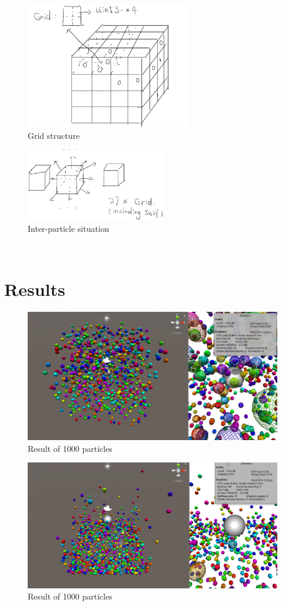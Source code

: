 \documentclass[acmtog]{acmart}
\begin{document}
\begin{figure}[!h]
	\includegraphics[width=7.2cm]{grid}
	\caption{Grid structure}
\end{figure}

\begin{figure}[!h]
	\includegraphics[width=6.1cm]{inter-particle}
	\caption{Inter-particle situation}
\end{figure}

\pagebreak
\quad \\

\pagebreak
\section{Results}
\begin{figure}[!h]
	\includegraphics[width=\linewidth]{r1}
	\caption{Result of 1000 particles}
\end{figure}
\begin{figure}[!h]
	\includegraphics[width=\linewidth]{r2}
	\caption{Result of 1000 particles}
\end{figure}
\vspace{20mm}
\end{document}
